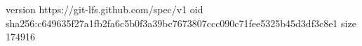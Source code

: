 version https://git-lfs.github.com/spec/v1
oid sha256:c649635f27a1fb2fa6c5b0f3a39bc7673807ccc090c71fee5325b45d3df3c8e1
size 174916
